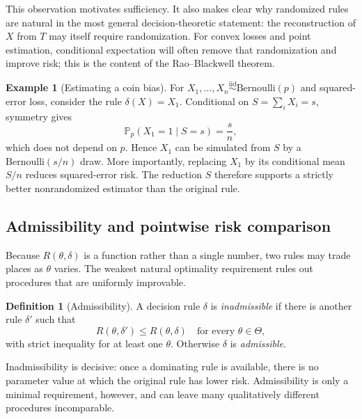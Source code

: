 \documentclass[12pt,oneside]{book}
\numberwithin{equation}{section}
\theoremstyle{definition}
\newtheorem{definition}{Definition}[section]
\newtheorem{example}{Example}[section]
\theoremstyle{plain}
\theoremstyle{remark}
\newcommand{\Prob}{\mathbb{P}}
\newcommand{\iid}{\overset{\text{iid}}{\sim}}
\newcommand{\Bern}{\mathrm{Bernoulli}}
\begin{document}
This observation motivates sufficiency.  It also makes clear why randomized
rules are natural in the most general decision-theoretic statement: the
reconstruction of $X$ from $T$ may itself require randomization.  For convex
losses and point estimation, conditional expectation will often remove that
randomization and improve risk; this is the content of the Rao--Blackwell
theorem.

\begin{example}[Estimating a coin bias]
For $X_1,\ldots,X_n\iid\Bern(p)$ and squared-error loss, consider the rule
$\delta(X)=X_1$.  Conditional on $S=\sum_iX_i=s$, symmetry gives
\[
    \Prob_p(X_1=1\mid S=s)=\frac{s}{n},
\]
which does not depend on $p$.  Hence $X_1$ can be simulated from $S$ by a
$\Bern(s/n)$ draw.  More importantly, replacing $X_1$ by its conditional mean
$S/n$ reduces squared-error risk.  The reduction $S$ therefore supports a
strictly better nonrandomized estimator than the original rule.
\end{example}

\subsection{Admissibility and pointwise risk comparison}

Because $R(\theta,\delta)$ is a function rather than a single number, two
rules may trade places as $\theta$ varies. The weakest natural optimality
requirement rules out procedures that are uniformly improvable.

\begin{definition}[Admissibility]
A decision rule $\delta$ is \emph{inadmissible} if there is another rule
$\delta'$ such that
\[
 R(\theta,\delta')\leq R(\theta,\delta)
 \quad\text{for every }\theta\in\Theta,
\]
with strict inequality for at least one $\theta$. Otherwise $\delta$ is
\emph{admissible}.
\end{definition}

Inadmissibility is decisive: once a dominating rule is available, there is
no parameter value at which the original rule has lower risk. Admissibility
is only a minimal requirement, however, and can leave many qualitatively
different procedures incomparable.
\end{document}
